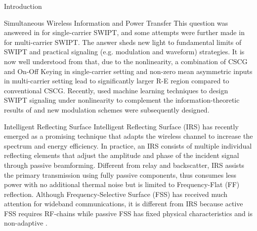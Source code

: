 \documentclass[journal]{IEEEtran}
\begin{document}
\begin{section}{Introduction}
\begin{subsection}{Simultaneous Wireless Information and Power Transfer}
			This question was answered in \cite{Varasteh2020} for single-carrier SWIPT, and some attempts were further made in \cite{Varasteh2019d} for multi-carrier SWIPT. The answer sheds new light to fundamental limits of SWIPT and practical signaling (e.g. modulation and waveform) strategies. It is now well understood from \cite{Clerckx2018b,Varasteh2020,Varasteh2019d} that, due to the nonlinearity, a combination of CSCG and On-Off Keying in single-carrier setting and non-zero mean asymmetric inputs in multi-carrier setting lead to significantly larger R-E region compared to conventional CSCG. Recently, \cite{Varasteh2020a} used machine learning techniques to design SWIPT signaling under nonlinearity to complement the information-theoretic results of \cite{Varasteh2020} and new modulation schemes were subsequently designed.
		\end{subsection}


		\begin{subsection}{Intelligent Reflecting Surface}
			Intelligent Reflecting Surface (IRS) has recently emerged as a promising technique that adapts the wireless channel to increase the spectrum and energy efficiency. In practice, an IRS consists of multiple individual reflecting elements that adjust the amplitude and phase of the incident signal through passive beamforming. Different from relay and backscatter, IRS assists the primary transmission using fully passive components, thus consumes less power with no additional thermal noise but is limited to Frequency-Flat (FF) reflection. Although Frequency-Selective Surface (FSS) has received much attention for wideband communications, it is different from IRS because active FSS requires RF-chains \cite{Kim2006} while passive FSS has fixed physical characteristics and is non-adaptive \cite{Anwar2018}.


\end{subsection}
\end{section}
\end{document}
